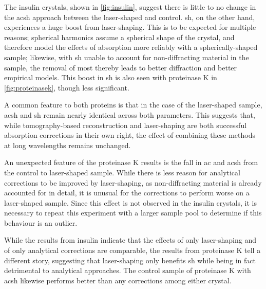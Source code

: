 The insulin crystals, shown in \cref{fig:insulin}, suggest there is little to no change in the \ac{acsh} approach between the laser-shaped and control. \Ac{sh}, on the other hand, experiences a huge boost from laser-shaping. This is to be expected for multiple reasons; spherical harmonics assume a spherical shape of the crystal, and therefore model the effects of absorption more reliably with a spherically-shaped sample; likewise, with \ac{sh} unable to account for non-diffracting material in the sample, the removal of most thereby leads to better diffraction and better empirical models. This boost in \ac{sh} is also seen with proteinase K in \cref{fig:proteinasek}, though less significant.

A common feature to both proteins is that in the case of the laser-shaped sample, \ac{acsh} and \ac{sh} remain nearly identical across both parameters.
This suggests that, while tomography-based reconstruction and laser-shaping are both successful absorption corrections in their own right, the effect of combining these methods at long wavelengths remains unchanged.

An unexpected feature of the proteinase K results is the fall in \ac{ac} and \ac{acsh} from the control to laser-shaped sample. While there is less reason for analytical corrections to be improved by laser-shaping, as non-diffracting material is already accounted for in detail, it is unusual for the corrections to perform worse on a laser-shaped sample. Since this effect is not observed in the insulin crystals, it is necessary to repeat this experiment with a larger sample pool to determine if this behaviour is an outlier.%

While the results from insulin indicate that the effects of only laser-shaping and of only analytical corrections are comparable, the results from proteinase K tell a different story, suggesting that laser-shaping only benefits \ac{sh} while being in fact detrimental to analytical approaches. The control sample of proteinase K with \ac{acsh} likewise performs better than any corrections among either crystal. %


